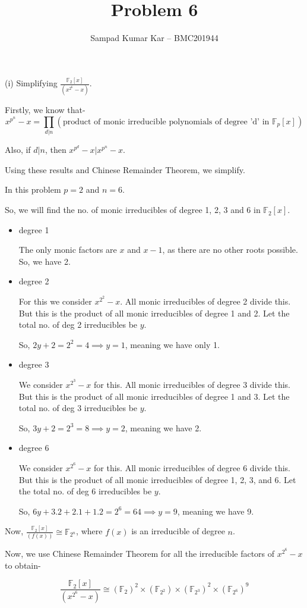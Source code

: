 \documentclass[12pt,a4paper]{article}
\title{Problem 6}
\author{Sampad Kumar Kar -- BMC201944}
\theoremstyle{definition}
\begin{document}
\maketitle

\begin{flushleft}

(i) Simplifying $\frac{\mathbb{F}_2[x]}{(x^{2^6}-x)}$.

\medskip

Firstly, we know that- $$x^{p^n} - x = \prod_{d|n} (\text{product of monic irreducible polynomials of degree 'd' in } \mathbb{F}_p[x])$$

Also, if $d|n$, then $x^{p^d}-x|x^{p^n}-x$.

\medskip

Using these results and Chinese Remainder Theorem, we simplify.

In this problem $p = 2$ and $n = 6$.

So, we will find the no. of monic irreducibles of degree 1, 2, 3 and 6 in $\mathbb{F}_2[x]$.

\begin{itemize}
	\item degree 1

	The only monic factors are $x$ and $x-1$, as there are no other roots possible. So, we have 2.

	\item degree 2

	For this we consider $x^{2^2} - x$. All monic irreducibles of degree 2 divide this. But this is the product of all monic irreducibles of degree 1 and 2. Let the total no. of deg 2 irreducibles be $y$.

	So, $2y + 2 = 2^2 = 4 \implies y = 1$, meaning we have only 1.

	\item degree 3

	We consider $x^{2^3}-x$ for this. All monic irreducibles of degree 3 divide this. But this is the product of all monic irreducibles of degree 1 and 3. Let the total no. of deg 3 irreducibles be $y$.

	So, $3y + 2 = 2^3 = 8 \implies y = 2$, meaning we have 2.

	\item degree 6

	We consider $x^{2^6} -x$ for this. All monic irreducibles of degree 6 divide this. But this is the product of all monic irreducibles of degree 1, 2, 3, and 6. Let the total no. of deg 6 irreducibles be $y$.

	So, $6y + 3.2 + 2.1 + 1.2 = 2^6 = 64 \implies y = 9$, meaning we have 9.
\end{itemize}

Now, $\frac{\mathbb{F}_2[x]}{(f(x))} \cong \mathbb{F}_{2^n}$, where $f(x)$ is an irreducible of degree $n$.

\medskip

Now, we use Chinese Remainder Theorem for all the irreducible factors of $x^{2^6} - x$ to obtain-

$$\frac{\mathbb{F}_2[x]}{(x^{2^6}-x)} \cong (\mathbb{F}_{2})^2 \times (\mathbb{F}_{2^2}) \times (\mathbb{F}_{2^3})^2 \times (\mathbb{F}_{2^6})^9$$

\end{flushleft}
\end{document}
